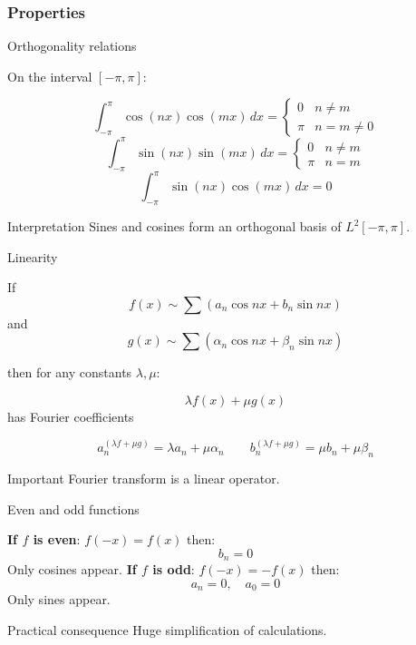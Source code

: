 \documentclass[aspectratio=169]{beamer}
\begin{document}
\subsubsection{Properties}

\begin{frame}{Orthogonality relations}

On the interval $[-\pi,\pi]$:

\[
\int_{-\pi}^{\pi} \cos(nx)\cos(mx)\,dx =
\begin{cases}
0 & n\neq m \\
\pi & n=m\neq 0
\end{cases}
\]
\pause
\[
\int_{-\pi}^{\pi} \sin(nx)\sin(mx)\,dx =
\begin{cases}
0 & n\neq m \\
\pi & n=m
\end{cases}
\]
\pause
\[
\int_{-\pi}^{\pi} \sin(nx)\cos(mx)\,dx = 0
\]
\pause
\begin{block}{Interpretation}
Sines and cosines form an orthogonal basis of $L^2[-\pi,\pi]$.
\end{block}

\end{frame}

\begin{frame}{Linearity}

If
\[
f(x) \sim \sum (a_n \cos nx + b_n \sin nx)
\]
and
\[
g(x) \sim \sum (\alpha_n \cos nx + \beta_n \sin nx)
\]

then for any constants $\lambda,\mu$:

\[
\lambda f(x)+\mu g(x)
\]
has Fourier coefficients

\[
a_n^{(\lambda f+\mu g)}=\lambda a_n+\mu \alpha_n
\qquad
b_n^{(\lambda f+\mu g)}=\mu b_n+\mu \beta_n
\]

\begin{block}{Important}
Fourier transform is a linear operator.
\end{block}

\end{frame}

\begin{frame}{Even and odd functions}

\textbf{If $f$ is even}: $
f(-x)=f(x)
$
then:
\[
b_n = 0
\]
Only cosines appear.
\pause
\textbf{If $f$ is odd}:
$
f(-x)=-f(x)
$
then:
\[
a_n = 0,\quad a_0=0
\]
Only sines appear.
\begin{block}{Practical consequence}
Huge simplification of calculations.
\end{block}

\end{frame}
\end{document}

